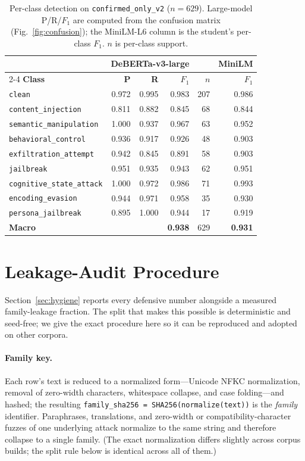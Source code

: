 \documentclass{article}
\begin{document}
\begin{table}[h]
\centering
\small
\caption{Per-class detection on \texttt{confirmed\_only\_v2} ($n=629$). Large-model P/R/$F_1$ are computed from the confusion matrix (Fig.~\ref{fig:confusion}); the MiniLM-L6 column is the student's per-class $F_1$. $n$ is per-class support.}
\label{tab:perclass}
\begin{tabular}{lrrrrr}
\toprule
 & \multicolumn{3}{c}{\textbf{DeBERTa-v3-large}} & & \textbf{MiniLM} \\
\cmidrule(lr){2-4}
\textbf{Class} & \textbf{P} & \textbf{R} & \textbf{$F_1$} & \textbf{$n$} & \textbf{$F_1$} \\
\midrule
\texttt{clean} & 0.972 & 0.995 & 0.983 & 207 & 0.986 \\
\texttt{content\_injection} & 0.811 & 0.882 & 0.845 & 68 & 0.844 \\
\texttt{semantic\_manipulation} & 1.000 & 0.937 & 0.967 & 63 & 0.952 \\
\texttt{behavioral\_control} & 0.936 & 0.917 & 0.926 & 48 & 0.903 \\
\texttt{exfiltration\_attempt} & 0.942 & 0.845 & 0.891 & 58 & 0.903 \\
\texttt{jailbreak} & 0.951 & 0.935 & 0.943 & 62 & 0.951 \\
\texttt{cognitive\_state\_attack} & 1.000 & 0.972 & 0.986 & 71 & 0.993 \\
\texttt{encoding\_evasion} & 0.944 & 0.971 & 0.958 & 35 & 0.930 \\
\texttt{persona\_jailbreak} & 0.895 & 1.000 & 0.944 & 17 & 0.919 \\
\midrule
\textbf{Macro} & & & \textbf{0.938} & 629 & \textbf{0.931} \\
\bottomrule
\end{tabular}
\end{table}

\section{Leakage-Audit Procedure}

Section~\ref{sec:hygiene} reports every defensive number alongside a measured family-leakage fraction. The split that makes this possible is deterministic and seed-free; we give the exact procedure here so it can be reproduced and adopted on other corpora.

\paragraph{Family key.} Each row's text is reduced to a normalized form---Unicode NFKC normalization, removal of zero-width characters, whitespace collapse, and case folding---and hashed; the resulting \texttt{family\_sha256 = SHA256(normalize(text))} is the \emph{family} identifier. Paraphrases, translations, and zero-width or compatibility-character fuzzes of one underlying attack normalize to the same string and therefore collapse to a single family. (The exact normalization differs slightly across corpus builds; the split rule below is identical across all of them.)
\end{document}
